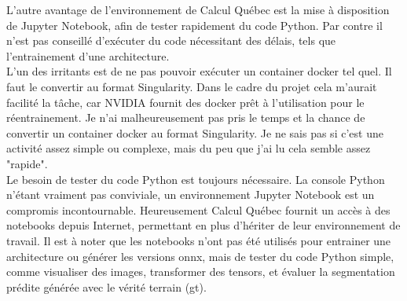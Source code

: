 \noindent L'autre avantage de l'environnement de Calcul Québec est la mise à disposition de Jupyter Notebook, afin de tester rapidement du code Python. Par contre il n'est pas conseillé d'exécuter du code nécessitant des délais, tels que l'entrainement d'une architecture. 
\vspace{\baselineskip}
\\
\noindent L'un des irritants est de ne pas pouvoir exécuter un container docker tel quel. Il faut le convertir au format Singularity. Dans le cadre du projet cela m'aurait facilité la tâche, car NVIDIA fournit des docker prêt à l'utilisation pour le réentrainement. Je n'ai malheureusement pas pris le temps et la chance de convertir un container docker au format Singularity. Je ne sais pas si c'est une activité assez simple ou complexe, mais du peu que j'ai lu cela semble assez "rapide".
\vspace{\baselineskip}
\\
\noindent Le besoin de tester du code Python est toujours nécessaire. La console Python n'étant vraiment pas conviviale, un environnement Jupyter Notebook est un compromis incontournable. Heureusement Calcul Québec fournit un accès à des notebooks depuis Internet, permettant en plus d'hériter de leur environnement de travail. Il est à noter que les notebooks n'ont pas été utilisés pour entrainer une architecture ou générer les versions \acrshort{onnx}, mais de tester du code Python simple, comme visualiser des images, transformer des tensors, et évaluer la segmentation prédite générée avec le vérité terrain (\acrshort{gt}). 
